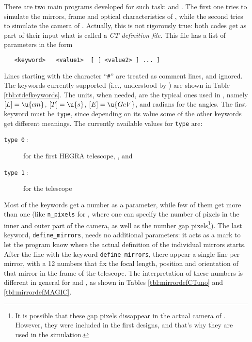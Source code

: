 There are two main programs developed for such task:  and
\camera. The first one tries to simulate the mirrors, frame and
optical characteristics of \MAGIC, while the second tries to simulate
the camera of \MAGIC. Actually, this is not rigorously true: both
codes get as part of their input what is called a \emph{CT definition
  file}. This file has a list of parameters in the form 
%
\begin{verbatim}
   <keyword>   <value1>  [ [ <value2> ] ... ]
\end{verbatim}
%
Lines starting with the character ``\texttt{\#}'' are treated as
comment lines, and ignored. The keywords currently supported (i.e.,
understood by ) are shown in Table \ref{tbl:ctdefkeywords}.
The units, when needed, are the typical ones used in \CORSIKA, namely
$[L]=\u{cm}$, $[T]=\u{s}$, $[E]=\u{GeV}$, and radians for the angles.
The first keyword must be \texttt{type}, since depending on its value
some of the other keywords get different meanings. The currently
available values for \texttt{type} are:
%
\begin{description}
\item[\texttt{type 0} :] for the first HEGRA telescope, \CTuno, and
\item[\texttt{type 1} :] for the \MAGIC telescope
\end{description}
%
Most of the keywords get a number as a parameter, while few of them
get more than one (like \texttt{n\_pixels} for \MAGIC, where one can
specify the number of pixels in the inner and outer part of the
camera, as well as the number gap pixels\footnote{It is possible that
  these gap pixels dissappear in the actual camera of \MAGIC. However,
  they were included in the first designs, and that's why they are
  used in the simulation.}). The last keyword,
\texttt{define\_mirrors}, needs no additional parameters: it acts as a
mark to let the program know where the actual definition of the
individual mirrors starts. After the line with the keyword
\texttt{define\_mirrors}, there appear a single line per mirror, with
a 12 numbers that fix the focal length, position and orientation of
that mirror in the frame of the telescope. The interpretation of these
numbers is different in general for \MAGIC and \CTuno, as shown in
Tables \ref{tbl:mirrordefCTuno} and \ref{tbl:mirrordefMAGIC}.

\ctdefkeywordstbl

\mirrordefCTunotbl

\mirrordefMAGICtbl

